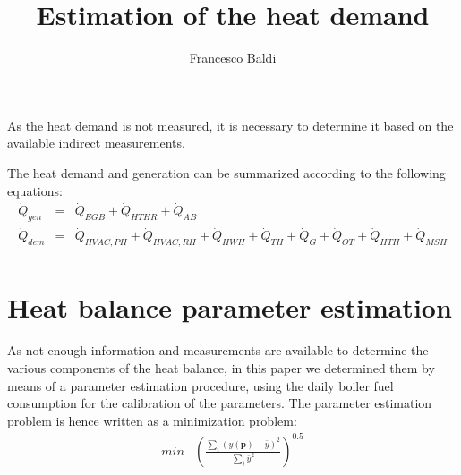 \documentclass[]{article}
\title{Estimation of the heat demand}
\author{Francesco Baldi}
\begin{document}
\maketitle

As the heat demand is not measured, it is necessary to determine it based on the available indirect measurements. 

The heat demand and generation can be summarized according to the following equations:
\begin{eqnarray}
\dot{Q}_{gen} & = & \dot{Q}_{EGB} + \dot{Q}_{HTHR} + \dot{Q}_{AB} \\
\dot{Q}_{dem} & = & \dot{Q}_{HVAC,PH} + \dot{Q}_{HVAC,RH} + \dot{Q}_{HWH} + \dot{Q}_{TH} + \dot{Q}_{G} + \dot{Q}_{OT} + \dot{Q}_{HTH} + \dot{Q}_{MSH} \\
\end{eqnarray}

\section{Heat balance parameter estimation}

As not enough information and measurements are available to determine the various components of the heat balance, in this paper we determined them by means of a parameter estimation procedure, using the daily boiler fuel consumption for the calibration of the parameters. The parameter estimation problem is hence written as a minimization problem:
\begin{eqnarray}
	min &  \left(\frac{\sum_i(y(\textbf{p})-\bar{y})^2}{\sum_i \bar{y}^2}\right)^{0.5} \\
\end{eqnarray}
\end{document}
